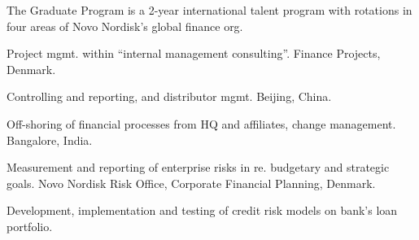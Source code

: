 \documentclass[a4paper]{janus-resume}
\begin{document}
\begin{minipage}[t]{0.49\textwidth}
\sectionspace %



\begin{tightitemize}
\item The Graduate Program is a 2-year international talent program with rotations in four areas of Novo Nordisk's global finance org.
\item Project mgmt. within ``internal management consulting''. Finance Projects, Denmark.
\item Controlling and reporting, and distributor mgmt. Beijing, China.
\item Off-shoring of financial processes from HQ and affiliates, change management. Bangalore, India.
\item Measurement and reporting of enterprise risks in re. budgetary and strategic goals. Novo Nordisk Risk Office, Corporate Financial Planning, Denmark.
\end{tightitemize}

\sectionspace %


\begin{tightitemize}
\item Development, implementation and testing of credit risk models on bank's loan portfolio.
\end{tightitemize}

\sectionspace %


\sectionspace %




\end{minipage} %

\end{document}
